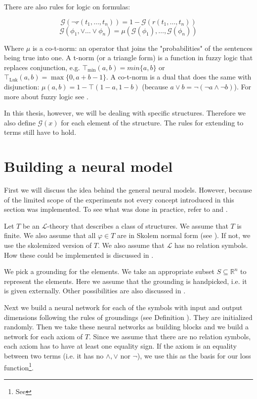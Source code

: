 There are also rules for logic on formulas:

$$\mathcal{G}(\neg r(t_1,\dots,t_n))=1-\mathcal{G}(r(t_1,\dots,t_n))$$
$$\mathcal{G}(\phi_1,\vee\dots \vee\phi_n)=\mu(\mathcal{G}(\phi_1),\dots,\mathcal{G}(\phi_n))$$

Where $\mu$ is a co-t-norm: an operator that joins the "probabilities" of the sentences being true into one. A t-norm (or a triangle form) is a function in fuzzy logic that replaces conjunction, e.g. $\top_{\min}(a,b)=min\{a,b\}$ or $\top_{\text{Luk}}(a,b)=\max\{0,a+b-1\}$. A co-t-norm is a dual that does the same with disjunction: $\mu(a,b)=1-\top(1-a,1-b)$ (because $a\vee b = \neg(\neg a\wedge \neg b)$). For more about fuzzy logic see \cite{fuzzy}.

In this thesis, however, we will be dealing with specific structures. Therefore we also define $\mathcal{G}(x)$ for each element of the structure. The rules for extending to terms still have to hold. 

\section{Building a neural model}
\label{section:building_models}

First we will discuss the idea behind the general neural models. However, because of the limited scope of the experiments not every concept introduced in this section was implemented. To see what was done in practice, refer to  and .

Let $T$ be an $\mathcal{L}$-theory that describes a class of structures. We assume that $T$ is finite. We also assume that all $\varphi\in T$ are in Skolem normal form (see ). If not, we use the skolemized version of $T$. We also assume that $\mathcal{L}$ has no relation symbols. How these could be implemented is discussed in .

We pick a grounding for the elements. We take an appropriate subset  $S\subseteq\mathbb{R}^n$ to represent the elements. Here we assume that the grounding is handpicked, i.e. it is given externally. Other possibilities are also discussed in .

Next we build a neural network for each of the symbols with input and output dimensions following the rules of groundings (see Definition ). They are initialized randomly. Then we take these neural networks as building blocks and we build a network for each axiom of $T$. Since we assume that there are no relation symbols, each axiom has to have at least one equality sign. If the axiom is an equality between two terms (i.e. it has no $\wedge,\vee$ nor $\neg$), we use this as the basis for our loss function\footnote{See }.\\

